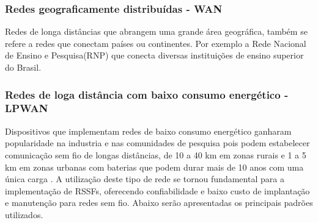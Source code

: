 \subsubsection{Redes geograficamente distribuídas - WAN}
Redes de longa distâncias que abrangem uma grande área geográfica, também se refere a redes que conectam países ou continentes. Por exemplo a Rede Nacional de Ensino e Pesquisa(RNP) que conecta diversas instituições de ensino superior do Brasil.

\subsubsection{Redes de loga distância com baixo consumo energético - LPWAN}
Dispositivos que implementam redes de baixo consumo energético ganharam popularidade na industria e nas comunidades de pesquisa pois podem estabelecer comunicação sem fio de longas distâncias, de 10 a 40 km em zonas rurais e 1 a 5 km em zonas urbanas com baterias que podem durar mais de 10 anos com uma única carga \cite{mekki2019comparative}. A utilização deste tipo de rede se tornou fundamental para a implementação de RSSFs, oferecendo confiabilidade e baixo custo de implantação e manutenção para redes sem fio. Abaixo serão apresentadas os principais padrões utilizados.




